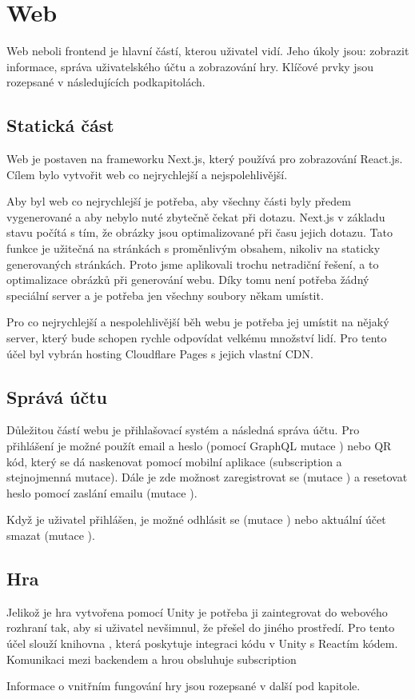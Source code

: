 \section{Web}
Web neboli frontend je hlavní částí, kterou uživatel vidí. Jeho úkoly jsou: zobrazit informace, správa uživatelského účtu a zobrazování hry. Klíčové prvky jsou rozepsané v následujících podkapitolách.

\subsection{Statická část}
Web je postaven na frameworku Next.js, který používá pro zobrazování React.js. Cílem bylo vytvořit web co nejrychlejší a nejspolehlivější.\par
Aby byl web co nejrychlejší je potřeba, aby všechny části byly předem vygenerované a aby nebylo nuté zbytečně čekat při dotazu. Next.js v základu stavu počítá s tím, že obrázky jsou optimalizované při času jejich dotazu. Tato funkce je užitečná na stránkách s proměnlivým obsahem, nikoliv na staticky generovaných stránkách. Proto jsme aplikovali trochu netradiční řešení, a to optimalizace obrázků při generování webu. Díky tomu není potřeba žádný speciální server a je potřeba jen všechny soubory někam umístit.\par
Pro co nejrychlejší a nespolehlivější běh webu je potřeba jej umístit na nějaký server, který bude schopen rychle odpovídat velkému množství lidí. Pro tento účel byl vybrán hosting Cloudflare Pages\cite{Cloudflare-pages} s jejich vlastní CDN\cite{Cloudflare-cdn}. 

\subsection{Správá účtu}
Důležitou částí webu je přihlašovací systém a následná správa účtu. Pro přihlášení je možné použít email a heslo (pomocí GraphQL mutace ) nebo QR kód, který se dá naskenovat pomocí mobilní aplikace (subscription  a stejnojmenná mutace). Dále je zde možnost zaregistrovat se (mutace ) a resetovat heslo pomocí zaslání emailu (mutace ).\par
Když je uživatel přihlášen, je možné odhlásit se (mutace ) nebo aktuální účet smazat (mutace ).

\subsection{Hra}
Jelikož je hra vytvořena pomocí Unity je potřeba ji zaintegrovat do webového rozhraní tak, aby si uživatel nevšimnul, že přešel do jiného prostředí. Pro tento účel slouží knihovna \cite{react-unity-webgl}, která poskytuje integraci kódu v Unity s Reactím kódem. Komunikaci mezi backendem a hrou obsluhuje subscription \par
Informace o vnitřním fungování hry jsou rozepsané v další pod kapitole.
